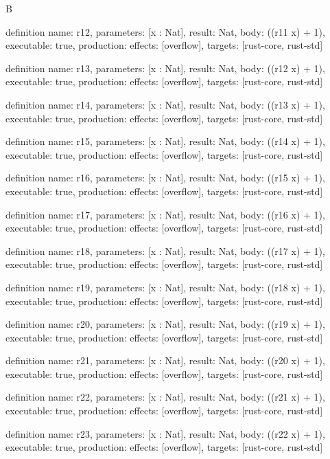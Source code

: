 \begin{lexlean}{B}
\begin{semanticmodule}
definition{
  name: r12,
  parameters: [x : Nat],
  result: Nat,
  body: ((r11 x) + 1),
  executable: true,
  production: {effects: [overflow], targets: [rust-core, rust-std]}
}

definition{
  name: r13,
  parameters: [x : Nat],
  result: Nat,
  body: ((r12 x) + 1),
  executable: true,
  production: {effects: [overflow], targets: [rust-core, rust-std]}
}

definition{
  name: r14,
  parameters: [x : Nat],
  result: Nat,
  body: ((r13 x) + 1),
  executable: true,
  production: {effects: [overflow], targets: [rust-core, rust-std]}
}

definition{
  name: r15,
  parameters: [x : Nat],
  result: Nat,
  body: ((r14 x) + 1),
  executable: true,
  production: {effects: [overflow], targets: [rust-core, rust-std]}
}

definition{
  name: r16,
  parameters: [x : Nat],
  result: Nat,
  body: ((r15 x) + 1),
  executable: true,
  production: {effects: [overflow], targets: [rust-core, rust-std]}
}

definition{
  name: r17,
  parameters: [x : Nat],
  result: Nat,
  body: ((r16 x) + 1),
  executable: true,
  production: {effects: [overflow], targets: [rust-core, rust-std]}
}

definition{
  name: r18,
  parameters: [x : Nat],
  result: Nat,
  body: ((r17 x) + 1),
  executable: true,
  production: {effects: [overflow], targets: [rust-core, rust-std]}
}

definition{
  name: r19,
  parameters: [x : Nat],
  result: Nat,
  body: ((r18 x) + 1),
  executable: true,
  production: {effects: [overflow], targets: [rust-core, rust-std]}
}

definition{
  name: r20,
  parameters: [x : Nat],
  result: Nat,
  body: ((r19 x) + 1),
  executable: true,
  production: {effects: [overflow], targets: [rust-core, rust-std]}
}

definition{
  name: r21,
  parameters: [x : Nat],
  result: Nat,
  body: ((r20 x) + 1),
  executable: true,
  production: {effects: [overflow], targets: [rust-core, rust-std]}
}

definition{
  name: r22,
  parameters: [x : Nat],
  result: Nat,
  body: ((r21 x) + 1),
  executable: true,
  production: {effects: [overflow], targets: [rust-core, rust-std]}
}

definition{
  name: r23,
  parameters: [x : Nat],
  result: Nat,
  body: ((r22 x) + 1),
  executable: true,
  production: {effects: [overflow], targets: [rust-core, rust-std]}
}


\end{semanticmodule}
\end{lexlean}
